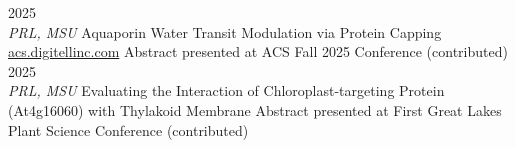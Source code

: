 \documentclass[9pt]{developercv} %
\begin{document}
\begin{entrylist}
	\entry 
		{2025 \\ \vspace{4pt}\color{gray} \textit{PRL, MSU}}
		{Aquaporin Water Transit Modulation via Protein Capping}
		{\href{https://acs.digitellinc.com/p/s/aquaporin-water-transit-modulation-via-protein-capping-638984}{acs.digitellinc.com}}
		{Abstract presented at ACS Fall 2025 Conference (contributed)}
	\entry 
		{2025 \\ \vspace{4pt}\color{gray} \textit{PRL, MSU}}
		{Evaluating the Interaction of Chloroplast-targeting Protein (At4g16060) with
		Thylakoid Membrane}
		{}
		{Abstract presented at First Great Lakes Plant Science Conference (contributed)}
\end{entrylist}
\end{document}
